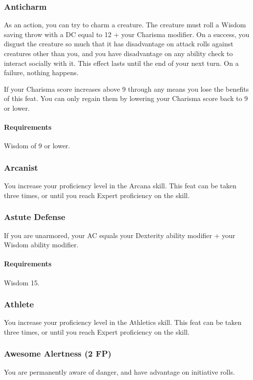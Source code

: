 \subsubsection{Anticharm} \label{feat::anticharm}
    As an action, you can try to charm a creature.
    The creature must roll a Wisdom saving throw with a DC equal to 12 + your Charisma modifier.
    On a success, you disgust the creature so much that it has disadvantage on attack rolls against creatures other than you, and you have disadvantage on any ability check to interact socially with it.
    This effect lasts until the end of your next turn.
    On a failure, nothing happens.

    If your Charisma score increases above 9 through any means you lose the benefits of this feat.
    You can only regain them by lowering your Charisma score back to 9 or lower.
    \paragraph{Requirements} Wisdom of 9 or lower.
\subsubsection{Arcanist} \label{feat::arcanist}
    You increase your proficiency level in the Arcana skill.
    This feat can be taken three times, or until you reach Expert proficiency on the skill.
\subsubsection{Astute Defense} \label{feat::astutedefense}
    If you are unarmored, your AC equals your Dexterity ability modifier + your Wisdom ability modifier.
    \paragraph{Requirements} Wisdom 15.
\subsubsection{Athlete} \label{feat::athlete}
    You increase your proficiency level in the Athletics skill.
    This feat can be taken three times, or until you reach Expert proficiency on the skill.
\subsubsection{Awesome Alertness (2 FP)} \label{feat::awesomealertness}
    You are permanently aware of danger, and have advantage on initiative rolls.

